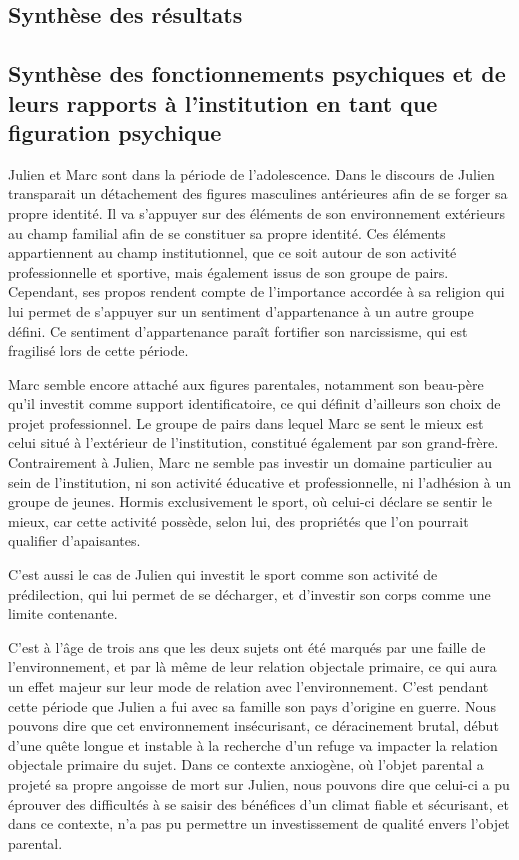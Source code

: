 \documentclass[12pt, a4paper]{book}
\begin{document}
\begin{spacing}{1.5}
\chapter{Synthèse des résultats}

\section{Synthèse des fonctionnements psychiques et de leurs rapports à l'institution en tant que figuration psychique}

Julien et Marc sont dans la période de l'adolescence. Dans le discours de Julien transparait un détachement des figures masculines antérieures afin de se forger sa propre identité. Il va s'appuyer sur des éléments de son environnement extérieurs au champ familial afin de se constituer sa propre identité. Ces éléments appartiennent au champ institutionnel, que ce soit autour de son activité professionnelle et sportive, mais également issus de son groupe de pairs. Cependant, ses propos rendent compte de l'importance accordée à sa religion qui lui permet de s'appuyer sur un sentiment d'appartenance à un autre groupe défini. Ce sentiment d'appartenance paraît fortifier son narcissisme, qui est fragilisé lors de cette période.                                                

Marc semble encore attaché aux figures parentales, notamment son beau-père qu'il investit comme support identificatoire, ce qui définit d'ailleurs son choix de projet professionnel. Le groupe de pairs dans lequel Marc se sent le mieux est celui situé à l'extérieur de l'institution, constitué également par son grand-frère. Contrairement à Julien, Marc ne semble pas investir un domaine particulier au sein de l'institution, ni son activité éducative et professionnelle, ni l'adhésion à un groupe de jeunes. Hormis exclusivement le sport, où celui-ci déclare se sentir le mieux, car cette activité possède, selon lui, des propriétés que l'on pourrait qualifier d'apaisantes. 

C'est aussi le cas de Julien qui investit le sport comme son activité de prédilection, qui lui permet de se décharger, et d'investir son corps comme une limite contenante.

C'est à l'âge de trois ans que les deux sujets ont été marqués par une faille de l'environnement, et par là même de leur relation objectale primaire,  ce qui aura un effet majeur sur leur mode de relation avec l'environnement. C'est pendant cette période que Julien a fui avec sa famille son pays d'origine en guerre. Nous pouvons dire que cet environnement insécurisant, ce déracinement brutal, début d'une quête longue et instable à la recherche d'un refuge va impacter la relation objectale primaire du sujet. Dans ce contexte anxiogène, où l'objet parental a projeté sa propre angoisse de mort sur Julien, nous pouvons dire que celui-ci a pu éprouver des difficultés à se saisir des bénéfices d'un climat fiable et sécurisant, et dans ce contexte, n'a pas pu permettre un investissement de qualité envers l'objet parental.       


\end{spacing}
\end{document}

